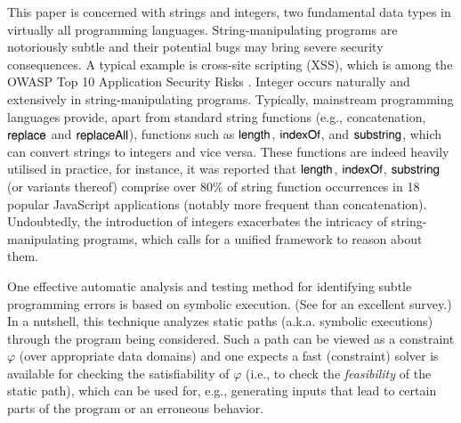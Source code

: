 

This paper is concerned with strings and integers, two fundamental data types in virtually all programming languages.
String-manipulating programs are notoriously subtle and their potential bugs %
may bring severe security consequences. A typical example is cross-site scripting
(XSS), which is among the OWASP Top 10 Application Security Risks
\cite{owasp17}. Integer occurs naturally and extensively in string-manipulating programs. %
Typically, mainstream programming languages provide, apart from standard string functions (e.g., concatenation, $\mathsf{replace}$ and $\mathsf{replaceAll}$), %
functions such as $\mathsf{length}$, $\mathsf{indexOf}$, and $\mathsf{substring}$, which can convert strings to integers and vice versa. %
These functions are indeed heavily utilised in practice, for instance, it was reported \cite{Berkeley-JavaScript} that $\mathsf{length}$, $\mathsf{indexOf}$, $\mathsf{substring}$ (or variants thereof) comprise over 80\% of string function occurrences in 18 popular JavaScript applications (notably more frequent than concatenation). Undoubtedly, the introduction of integers exacerbates the intricacy of string-manipulating programs, which calls for a unified framework to reason about them. 



One effective automatic analysis and testing method for identifying subtle programming errors is based on symbolic execution.
(See \cite{symbex-survey} for an excellent survey.)
In a nutshell, this technique analyzes static paths
(a.k.a. symbolic executions) through the program being considered. %
Such a path can be viewed as a constraint $\varphi$ (over
appropriate data domains) and one expects a fast (constraint)
solver is available for checking the satisfiability of $\varphi$ (i.e., to check
the \emph{feasibility} of the static path), which can be used for, e.g.,  generating
inputs that lead to certain parts of the program or an erroneous behavior.




